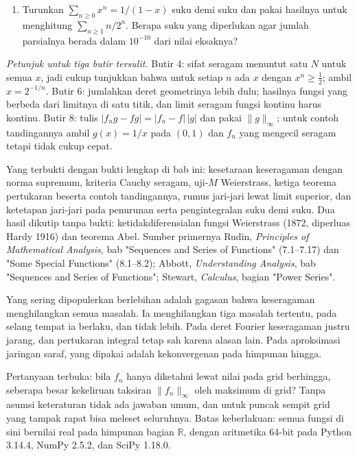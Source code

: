 \begin{latihan}
\begin{enumerate}
\item Turunkan $\sum_{n\ge0}x^n=1/(1-x)$ suku demi suku dan pakai hasilnya
      untuk menghitung $\sum_{n\ge1}n/2^n$. Berapa suku yang diperlukan agar
      jumlah parsialnya berada dalam $10^{-10}$ dari nilai eksaknya?
\end{enumerate}

\noindent\emph{Petunjuk untuk tiga butir tersulit.} Butir 4: sifat seragam
menuntut satu $N$ untuk semua $x$, jadi cukup tunjukkan bahwa untuk setiap $n$
ada $x$ dengan $x^n\ge\tfrac12$; ambil $x=2^{-1/n}$. Butir 6: jumlahkan deret
geometrinya lebih dulu; hasilnya fungsi yang berbeda dari limitnya di satu titik,
dan limit seragam fungsi kontinu harus kontinu. Butir 8: tulis
$|f_ng-fg|=|f_n-f|\,|g|$ dan pakai $\|g\|_\infty$; untuk contoh tandingannya
ambil $g(x)=1/x$ pada $(0,1)$ dan $f_n$ yang mengecil seragam tetapi tidak
cukup cepat.
\end{latihan}

\begin{untukpeneliti}
Yang terbukti dengan bukti lengkap di bab ini: kesetaraan keseragaman dengan
norma supremum, kriteria Cauchy seragam, uji-$M$ Weierstrass, ketiga teorema
pertukaran beserta contoh tandingannya, rumus jari-jari lewat limit superior, dan
ketetapan jari-jari pada penurunan serta pengintegralan suku demi suku. Dua hasil
dikutip tanpa bukti: ketidakdiferensialan fungsi Weierstrass (1872, diperluas
Hardy 1916) dan teorema Abel. Sumber primernya Rudin, \emph{Principles of
Mathematical Analysis}, bab "Sequences and Series of Functions" (7.1--7.17) dan
"Some Special Functions" (8.1--8.2); Abbott, \emph{Understanding Analysis}, bab
"Sequences and Series of Functions"; Stewart, \emph{Calculus}, bagian "Power
Series".

Yang sering dipopulerkan berlebihan adalah gagasan bahwa keseragaman
menghilangkan semua masalah. Ia menghilangkan tiga masalah tertentu, pada selang
tempat ia berlaku, dan tidak lebih. Pada deret Fourier keseragaman justru jarang,
dan pertukaran integral tetap sah karena alasan lain. Pada aproksimasi jaringan
saraf, yang dipakai adalah kekonvergenan pada himpunan hingga.

Pertanyaan terbuka: bila $f_n$ hanya diketahui lewat nilai pada grid berhingga,
seberapa besar kekeliruan taksiran $\|f_n\|_\infty$ oleh maksimum di grid? Tanpa
asumsi keteraturan tidak ada jawaban umum, dan untuk puncak sempit grid yang
tampak rapat bisa meleset seluruhnya. Batas keberlakuan: semua fungsi di sini
bernilai real pada himpunan bagian $\mathbb{R}$, dengan aritmetika 64-bit pada
Python 3.14.4, NumPy 2.5.2, dan SciPy 1.18.0.
\end{untukpeneliti}

